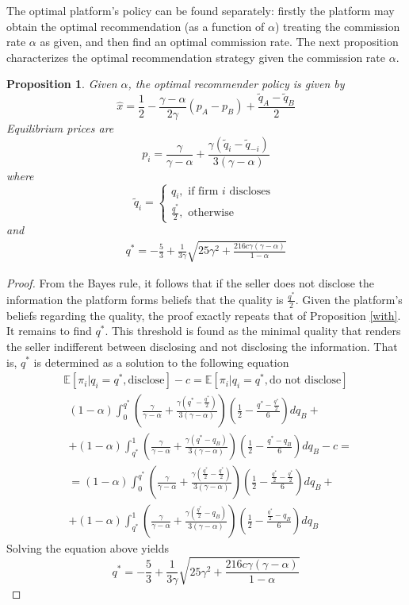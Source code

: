 \documentclass[a4paper]{article}
\newtheorem{proposition}[theorem]{Proposition}
\begin{document}
The optimal platform's policy can be found separately: firstly the platform may obtain the optimal recommendation (as a function of $\alpha$) treating the commission rate $\alpha$ as given, and then find an optimal commission rate. The next proposition characterizes the optimal recommendation strategy given the commission rate $\alpha$.

	\begin{proposition}\label{precise}
		Given $\alpha$, the optimal recommender policy is given by $$\hat{x} = \frac{1}{2} - \frac{\gamma-\alpha}{2 \gamma}(p_A - p_B) + \frac{\tilde{q}_A - \tilde{q}_B}{2}$$
		Equilibrium prices are $$p_i = \frac{\gamma}{\gamma - \alpha} + \frac{\gamma(\tilde{q}_{i} -\tilde{q}_{-i})}{3(\gamma-\alpha)}$$ where $$\tilde{q}_i = \begin{cases}
		q_i, \text{ if firm }i\text{ discloses }\\
		\frac{q^*}{2}, \text{ otherwise}
		\end{cases}$$
		and
		\begin{align}\label{threshold}
		q^* = -\frac{5}{3} + \frac{1}{3 \gamma} \sqrt{25 \gamma^2 + \frac{216 c \gamma (\gamma - \alpha)}{1 - \alpha}}
		\end{align}
	\end{proposition} 
\begin{proof}
From the Bayes rule, it follows that if the seller does not disclose the information the platform forms beliefs that the quality is $\frac{q^*}{2}$. Given the platform's beliefs regarding the quality, the proof exactly repeats that of Proposition \ref{with}. It remains to find $q^*$. This threshold is found as the minimal quality that renders the seller indifferent between disclosing and not disclosing the information. That is, $q^*$ is determined as a solution to the following equation	\begin{align*}
	\mathbb{E} [\pi_i|q_i=q^*, \text{disclose}] - c = \mathbb{E} [\pi_i|q_i=q^*, \text{do not disclose}]
	\end{align*}
	\begin{align*}
	&(1-\alpha)\int_{0}^{q^*} \left(\frac{\gamma}{\gamma - \alpha} + \frac{\gamma\left(q^* - \frac{q^*}{2}\right)}{3(\gamma - \alpha)} \right) \left(\frac{1}{2} - \frac{q^* - \frac{q^*}{2}}{6}\right)dq_B +\\ &+(1-\alpha)\int_{q^*}^{1} \left(\frac{\gamma}{\gamma - \alpha} + \frac{\gamma(q^* - q_B)}{3(\gamma - \alpha)} \right) \left(\frac{1}{2} - \frac{q^* - q_B}{6}\right)dq_B - c = \\
	&=(1-\alpha)\int_{0}^{q^*} \left(\frac{\gamma}{\gamma - \alpha} + \frac{\gamma\left(\frac{q^*}{2} - \frac{q^*}{2}\right)}{3(\gamma - \alpha)} \right) \left(\frac{1}{2} - \frac{\frac{q^*}{2} - \frac{q^*}{2}}{6}\right)dq_B +\\
	&+ (1-\alpha)\int_{q^*}^{1} \left(\frac{\gamma}{\gamma - \alpha} + \frac{\gamma(\frac{q^*}{2} - q_B)}{3(\gamma - \alpha)} \right) \left(\frac{1}{2} - \frac{\frac{q^*}{2} - q_B}{6}\right)dq_B
	\end{align*}
	Solving the equation above yields
	$$q^* = -\frac{5}{3} + \frac{1}{3 \gamma} \sqrt{25 \gamma^2 + \frac{216 c \gamma (\gamma - \alpha)}{1 - \alpha}}$$
\end{proof}
\end{document}
